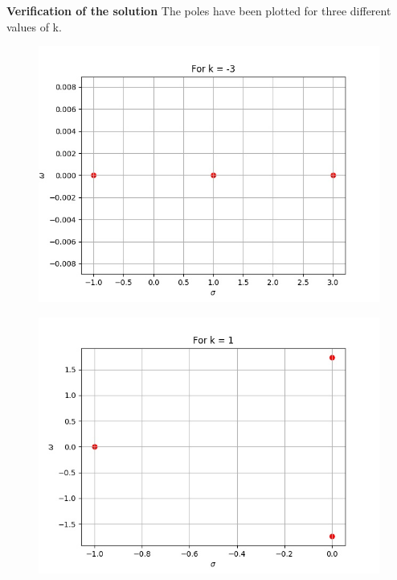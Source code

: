 \documentclass{beamer}
\begin{document}
\begin{frame}{\textbf{Verification of the solution}}
The poles have been plotted for three different values of k.
\begin{figure}
\includegraphics[scale = 0.6]{k=-3.jpg}
\end{figure}
\end{frame}

\begin{frame}
\begin{figure}
\includegraphics[scale = 0.6]{k=1.jpg}
\end{figure}
\end{frame}
\end{document}
